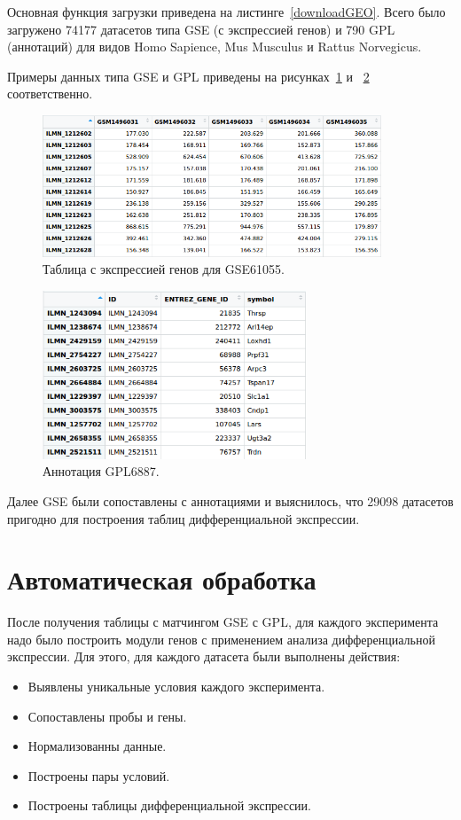 \documentclass[times,specification,annotation]{itmo-student-thesis}
\begin{document}
Основная функция загрузки приведена на листинге~\ref{downloadGEO}. Всего было загружено 74177 датасетов типа GSE (с экспрессией генов) и 790 GPL (аннотаций) для видов Homo Sapience, Mus Musculus и Rattus Norvegicus. 

Примеры данных типа GSE и GPL приведены на рисунках~\ref{GSE61055} и ~\ref{GPL6887} соответственно. 

\begin{figure}[!h]
    \caption{Таблица с экспрессией генов для GSE61055.}\label{GSE61055}
    \centering
    \includegraphics[width=0.9\textwidth]{GSE61055.png}
\end{figure}  

\begin{figure}[!h]
    \caption{Аннотация GPL6887.}\label{GPL6887}
    \centering
    \includegraphics[width=0.7\textwidth]{GPL6887.png}
\end{figure} 

Далее GSE были сопоставлены с аннотациями и выяснилось, что 29098 датасетов пригодно для построения таблиц ​дифференциальной экспрессии.


\section{Автоматическая обработка}

После получения таблицы с матчингом GSE с GPL, для каждого эксперимента надо было построить модули генов с применением анализа дифференциальной экспрессии. Для этого, для каждого датасета были выполнены действия:
\begin{itemize}
    \item Выявлены уникальные условия каждого эксперимента.
    \item Сопоставлены пробы и гены.
    \item Нормализованны данные.
    \item Построены пары условий.
    \item Построены таблицы дифференциальной экспрессии.
\end{itemize}
\end{document}
